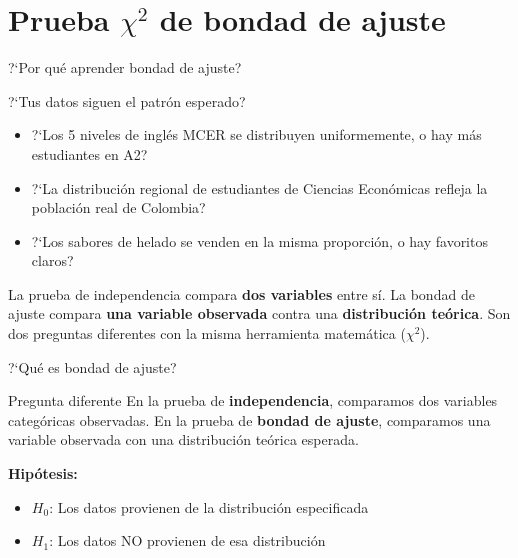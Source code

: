 \documentclass[aspectratio=169, 11pt]{beamer}
\begin{document}
\section{Prueba $\chi^2$ de bondad de ajuste}

\begin{frame}{?`Por qu\'e aprender bondad de ajuste?}
\small
\begin{exampleblock}{?`Tus datos siguen el patr\'on esperado?}
\begin{itemize}\setlength{\itemsep}{2pt}
  \item ?`Los 5 niveles de ingl\'es MCER se distribuyen uniformemente, o hay m\'as estudiantes en A2?
  \item ?`La distribuci\'on regional de estudiantes de Ciencias Econ\'omicas refleja la poblaci\'on real de Colombia?
  \item ?`Los sabores de helado se venden en la misma proporci\'on, o hay favoritos claros?
\end{itemize}
\end{exampleblock}

\vspace{0.2cm}
La prueba de independencia compara \textbf{dos variables} entre s\'i. La bondad de ajuste compara \textbf{una variable observada} contra una \textbf{distribuci\'on te\'orica}. Son dos preguntas diferentes con la misma herramienta matem\'atica ($\chi^2$).
\end{frame}

\begin{frame}{?`Qu\'e es bondad de ajuste?}
\begin{block}{Pregunta diferente}
En la prueba de \textbf{independencia}, comparamos dos variables categ\'oricas observadas.
En la prueba de \textbf{bondad de ajuste}, comparamos una variable observada con una distribuci\'on te\'orica esperada.
\end{block}

\vspace{0.2cm}
\textbf{Hip\'otesis:}
\begin{itemize}
  \item $H_0$: Los datos provienen de la distribuci\'on especificada
  \item $H_1$: Los datos NO provienen de esa distribuci\'on
\end{itemize}
\end{frame}
\end{document}
